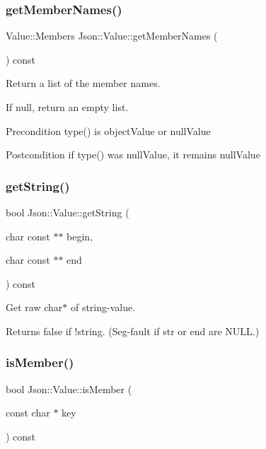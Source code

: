 \subsubsection{\texorpdfstring{get\+Member\+Names()}{getMemberNames()}}
{\footnotesize\ttfamily Value\+::\+Members Json\+::\+Value\+::get\+Member\+Names (\begin{DoxyParamCaption}{ }\end{DoxyParamCaption}) const}



Return a list of the member names. 

If null, return an empty list. \begin{DoxyPrecond}{Precondition}
type() is object\+Value or null\+Value 
\end{DoxyPrecond}
\begin{DoxyPostcond}{Postcondition}
if type() was null\+Value, it remains null\+Value 
\end{DoxyPostcond}
\mbox{\label{class_json_1_1_value_a2e1b7be6bde2fe23f15290d9ddbbdf8a}} 
\subsubsection{\texorpdfstring{get\+String()}{getString()}}
{\footnotesize\ttfamily bool Json\+::\+Value\+::get\+String (\begin{DoxyParamCaption}\item[{char const $\ast$$\ast$}]{begin,  }\item[{char const $\ast$$\ast$}]{end }\end{DoxyParamCaption}) const}

Get raw char$\ast$ of string-\/value. \begin{DoxyReturn}{Returns}
false if !string. (Seg-\/fault if str or end are N\+U\+LL.) 
\end{DoxyReturn}
\mbox{\label{class_json_1_1_value_ad6d4df2227321bab05e86667609a7fad}} 
\subsubsection{\texorpdfstring{is\+Member()}{isMember()}\hspace{0.1cm}{\footnotesize\ttfamily [1/2]}}
{\footnotesize\ttfamily bool Json\+::\+Value\+::is\+Member (\begin{DoxyParamCaption}\item[{const char $\ast$}]{key }\end{DoxyParamCaption}) const}

